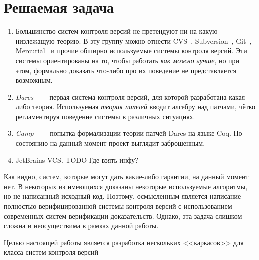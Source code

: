 \section{Решаемая задача}


\begin{enumerate}
\item Большинство систем контроля версий не претендуют ни на какую
  низлежащую теорию. В эту группу можно отнести CVS~\cite{cvs},
  Subversion~\cite{svnbook}, Git~\cite{progit},
  Mercurial~\cite{mercurial} %
  и прочие обширно используемые системы контроля версий. Эти системы
  ориентированы на то, чтобы работать \emph{как можно лучше}, но при
  этом, формально доказать что-либо про их поведение не представляется
  возможным.
\item \emph{Darcs}~\cite{darcs}~--- первая система контроля версий,
  для которой разработана какая-либо теория. Используемая \emph{теория
    патчей} вводит алгебру над патчами, чётко регламентируя поведение
  системы в различных ситуациях.
\item \emph{Camp}~\cite{camp}~--- попытка формализации теории патчей
  Darcs на языке Coq. По состоянию на данный момент проект выглядит
  заброшенным.
\item JetBrains VCS.
TODO Где взять инфу?
\end{enumerate}

Как видно, систем, которые могут дать какие-либо гарантии, на данный
момент нет. В некоторых из имеющихся доказаны некоторые используемые
алгоритмы, но не написанный исходный код. Поэтому, осмысленным
является написание полностью верифицированной системы контроля версий
с использованием современных систем верификации доказательств.
Однако, эта задача слишком сложна и неосуществима в рамках данной
работы.

Целью настоящей работы является разработка нескольких <<каркасов>> для
класса систем контроля версий
%
